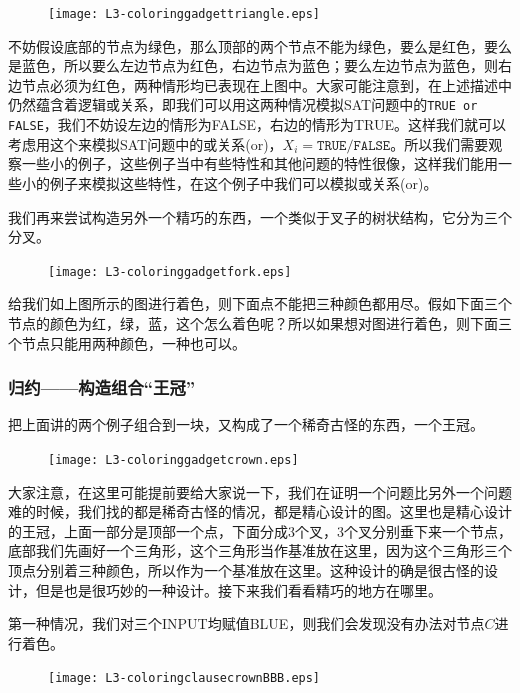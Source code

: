 \begin{figure}[H]
\centering
 \texttt{[image: L3-coloringgadgettriangle.eps]}
\end{figure}

不妨假设底部的节点为绿色，那么顶部的两个节点不能为绿色，要么是红色，要么是蓝色，所以要么左边节点为红色，右边节点为蓝色；要么左边节点为蓝色，则右边节点必须为红色，两种情形均已表现在上图中。大家可能注意到，在上述描述中仍然蕴含着逻辑或关系，即我们可以用这两种情况模拟SAT问题中的\texttt{TRUE or FALSE}，我们不妨设左边的情形为FALSE，右边的情形为TRUE。这样我们就可以考虑用这个来模拟SAT问题中的或关系(or)，$X_i = \texttt{TRUE/FALSE}$。所以我们需要观察一些小的例子，这些例子当中有些特性和其他问题的特性很像，这样我们能用一些小的例子来模拟这些特性，在这个例子中我们可以模拟或关系(or)。

我们再来尝试构造另外一个精巧的东西，一个类似于叉子的树状结构，它分为三个分叉。

\begin{figure}[H]
\centering
 \texttt{[image: L3-coloringgadgetfork.eps]}
\end{figure}

给我们如上图所示的图进行着色，则下面点不能把三种颜色都用尽。假如下面三个节点的颜色为红，绿，蓝，这个怎么着色呢？所以如果想对图进行着色，则下面三个节点只能用两种颜色，一种也可以。

\subsubsection{归约——构造组合“王冠”}
把上面讲的两个例子组合到一块，又构成了一个稀奇古怪的东西，一个王冠。

\begin{figure}[H]
\centering
 \texttt{[image: L3-coloringgadgetcrown.eps]}
\end{figure}

大家注意，在这里可能提前要给大家说一下，我们在证明一个问题比另外一个问题难的时候，我们找的都是稀奇古怪的情况，都是精心设计的图。这里也是精心设计的王冠，上面一部分是顶部一个点，下面分成3个叉，3个叉分别垂下来一个节点，底部我们先画好一个三角形，这个三角形当作基准放在这里，因为这个三角形三个顶点分别着三种颜色，所以作为一个基准放在这里。这种设计的确是很古怪的设计，但是也是很巧妙的一种设计。接下来我们看看精巧的地方在哪里。

第一种情况，我们对三个INPUT均赋值BLUE，则我们会发现没有办法对节点$C$进行着色。

\begin{figure}[H]
\centering
 \texttt{[image: L3-coloringclausecrownBBB.eps]}
\end{figure}


